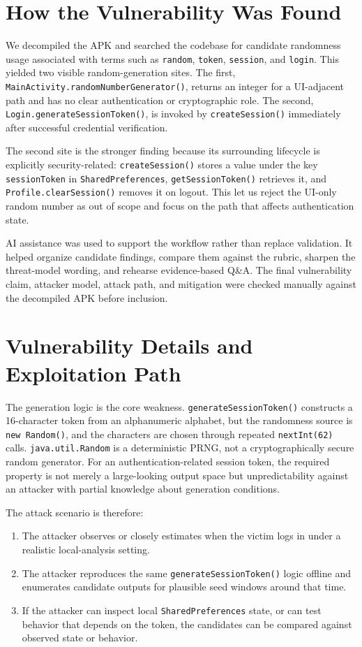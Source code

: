 \documentclass[letterpaper,twocolumn,10pt]{article}
\begin{document}
\section{How the Vulnerability Was Found}
We decompiled the APK and searched the codebase for candidate randomness usage associated with terms such as \texttt{random}, \texttt{token}, \texttt{session}, and \texttt{login}. This yielded two visible random-generation sites. The first, \texttt{MainActivity.randomNumberGenerator()}, returns an integer for a UI-adjacent path and has no clear authentication or cryptographic role. The second, \texttt{Login.generateSessionToken()}, is invoked by \texttt{createSession()} immediately after successful credential verification.

The second site is the stronger finding because its surrounding lifecycle is explicitly security-related: \texttt{createSession()} stores a value under the key \texttt{sessionToken} in \texttt{SharedPreferences}, \texttt{getSessionToken()} retrieves it, and \texttt{Profile.clearSession()} removes it on logout. This let us reject the UI-only random number as out of scope and focus on the path that affects authentication state.

AI assistance was used to support the workflow rather than replace validation. It helped organize candidate findings, compare them against the rubric, sharpen the threat-model wording, and rehearse evidence-based Q\&A. The final vulnerability claim, attacker model, attack path, and mitigation were checked manually against the decompiled APK before inclusion.

\section{Vulnerability Details and Exploitation Path}
The generation logic is the core weakness. \texttt{generateSessionToken()} constructs a 16-character token from an alphanumeric alphabet, but the randomness source is \texttt{new Random()}, and the characters are chosen through repeated \texttt{nextInt(62)} calls. \texttt{java.util.Random} is a deterministic PRNG, not a cryptographically secure random generator. For an authentication-related session token, the required property is not merely a large-looking output space but unpredictability against an attacker with partial knowledge about generation conditions.

The attack scenario is therefore:
\begin{enumerate}[leftmargin=*,nosep]
    \item The attacker observes or closely estimates when the victim logs in under a realistic local-analysis setting.
    \item The attacker reproduces the same \texttt{generateSessionToken()} logic offline and enumerates candidate outputs for plausible seed windows around that time.
    \item If the attacker can inspect local \texttt{SharedPreferences} state, or can test behavior that depends on the token, the candidates can be compared against observed state or behavior.
\end{enumerate}
\end{document}

